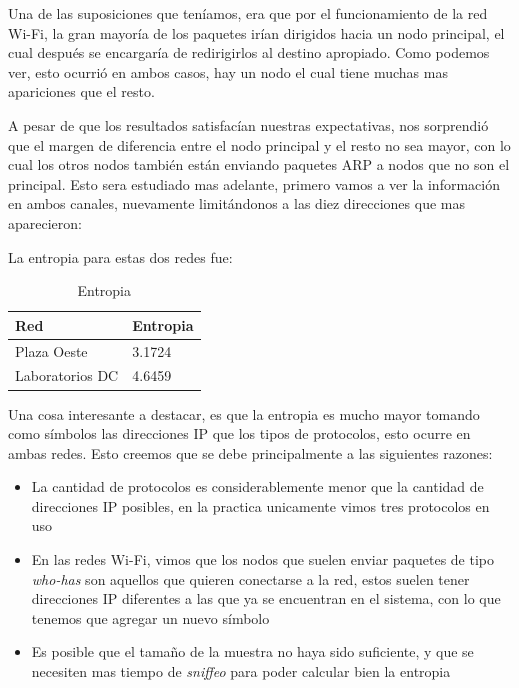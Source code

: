 Una de las suposiciones que teníamos, era que por el funcionamiento de la red Wi-Fi, la gran mayoría de los paquetes irían dirigidos hacia un nodo principal, el cual después se encargaría de redirigirlos al destino apropiado. Como podemos ver, esto ocurrió en ambos casos, hay un nodo el cual tiene muchas mas apariciones que el resto.

A pesar de que los resultados satisfacían nuestras expectativas, nos sorprendió que el margen de diferencia entre el nodo principal y el resto no sea mayor, con lo cual los otros nodos también están enviando paquetes ARP a nodos que no son el principal. Esto sera estudiado mas adelante, primero vamos a ver la información en ambos canales, nuevamente limitándonos a las diez direcciones que mas aparecieron:

%

La entropia para estas dos redes fue:

\begin{table}[H]
\centering
\caption{Entropia}
\label{my-label}
\begin{tabular}{ll}
\hline
Red         & Entropia \\ \hline
Plaza Oeste & 3.1724   \\
Laboratorios DC    & 4.6459   \\ \hline
\end{tabular}
\end{table}

Una cosa interesante a destacar, es que la entropia es mucho mayor tomando como símbolos las direcciones IP que los tipos de protocolos, esto ocurre en ambas redes. Esto creemos que se debe principalmente a las siguientes razones:

\begin{itemize}
	\item La cantidad de protocolos es considerablemente menor que la cantidad de direcciones IP posibles, en la practica unicamente vimos tres protocolos en uso
	\item En las redes Wi-Fi, vimos que los nodos que suelen enviar paquetes de tipo \textit{who-has} son aquellos que quieren conectarse a la red, estos suelen tener direcciones IP diferentes a las que ya se encuentran en el sistema, con lo que tenemos que agregar un nuevo símbolo
	\item Es posible que el tamaño de la muestra no haya sido suficiente, y que se necesiten mas tiempo de \textit{sniffeo} para poder calcular bien la entropia
\end{itemize}

